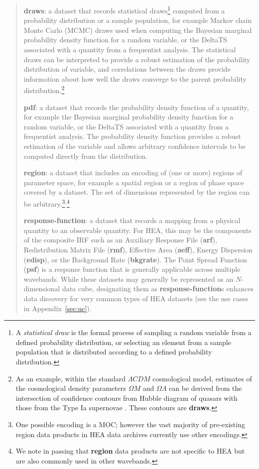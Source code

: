 \documentclass[11pt,a4paper]{ivoa}
\begin{document}
\begin{quote}
{\bf draws}: a dataset that records statistical draws\footnote{A {\em statistical draw\/} is the formal process of sampling a random variable from a defined probability distribution, or selecting an element from a sample population that is distributed according to a defined probability distribution.} computed from a probability distribution or a sample population, for example Markov chain Monte Carlo (MCMC) draws used when computing the Bayesian marginal probability density function for a random variable, or the DeltaTS associated with a quantity from a frequentist analysis. The statistical draws can be interpreted to provide a robust estimation of the probability distribution of variable, and correlations between the draws provide information about how well the draws converge to the parent probability distribution.\footnote{As an example, within the standard $\Lambda CDM$ cosmological model, estimates of the cosmological density parameters $\Omega M$ and $\Omega\Lambda$ can be derived from the intersection of confidence contours from Hubble diagram of quasars with those from the Type Ia supernovae \citep{2019adds.book..283C}.  These contours are {\bf draws}.}

{\bf pdf}: a dataset that records the probability density function of a quantity, for example the Bayesian marginal probability density function for a random variable, or the DeltaTS associated with a quantity from a frequentist analysis. The probability density function provides a robust estimation of the variable and allows arbitrary confidence intervals to be computed directly from the distribution.

{\bf region}: a dataset that includes an encoding of (one or more) regions of parameter space, for example a spatial region or a region of phase space covered by a dataset. The set of dimensions represented by the region can be arbitrary.\footnote{One possible encoding is a \gls{MOC}; however the vast majority of pre-existing region data products in \gls{HEA} data archives currently use other encodings.}$^{, }$\footnote{We note in passing that {\bf region} data products are not specific to \gls{HEA} but are also commonly used in other wavebands.}

{\bf response-function}: a dataset that records a mapping from a physical quantity to an observable quantity. For \gls{HEA}, this may be the components of the composite \gls{IRF} such as an Auxiliary Response File ({\bf arf}), Redistribution Matrix File ({\bf rmf}), Effective Area ({\bf aeff}), Energy Dispersion ({\bf edisp}), or the Background Rate ({\bf bkgrate}). The Point Spread Function ({\bf psf}) is a response function that is generally applicable across multiple wavebands. While these datasets may generally be represented as an $N$-dimensional data cube, designating them as {\bf response-function}s enhances data discovery for very common types of \gls{HEA} datasets (see the use cases in Appendix~\ref{sec:uc}).
\end{quote}
\end{document}

